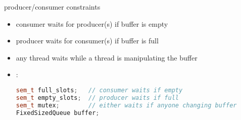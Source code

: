 \begin{frame}[fragile,label=pcConstraints]{producer/consumer constraints}
    \begin{itemize}
    \item consumer waits for producer(s) if buffer is empty
    \item producer waits for consumer(s) if buffer is full
    \item any thread waits while a thread is manipulating the buffer
    \vspace{.5cm}
    \item<2-> :
\begin{lstlisting}[language=C++,style=small]
sem_t full_slots;   // consumer waits if empty
sem_t empty_slots;  // producer waits if full
sem_t mutex;        // either waits if anyone changing buffer
FixedSizedQueue buffer;
\end{lstlisting}
    \end{itemize}
\end{frame}

